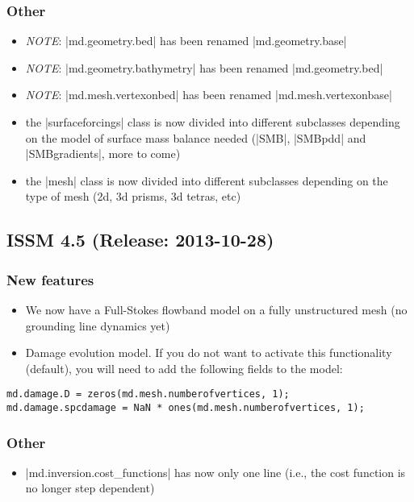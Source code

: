 \subsubsection{Other}
\begin{itemize}
\item \emph{NOTE}: \lstinlinebg|md.geometry.bed| has been renamed \lstinlinebg|md.geometry.base|
\item \emph{NOTE}: \lstinlinebg|md.geometry.bathymetry| has been renamed \lstinlinebg|md.geometry.bed|
\item \emph{NOTE}: \lstinlinebg|md.mesh.vertexonbed| has been renamed \lstinlinebg|md.mesh.vertexonbase|
\item the \lstinlinebg|surfaceforcings| class is now divided into different subclasses depending on the model of surface mass balance needed (\lstinlinebg|SMB|, \lstinlinebg|SMBpdd| and \lstinlinebg|SMBgradients|, more to come)
\item the \lstinlinebg|mesh| class is now divided into different subclasses depending on the type of mesh (2d, 3d prisms, 3d tetras, etc)
\end{itemize}

\subsection*{ISSM 4.5 (Release: 2013-10-28)}
\subsubsection{New features}
\begin{itemize}
\item We now have a Full-Stokes flowband model on a fully unstructured mesh (no grounding line dynamics yet)
\item Damage evolution model. If you do not want to activate this functionality (default), you will need to add the following fields to the model:
\end{itemize}
\begin{lstlisting}
md.damage.D = zeros(md.mesh.numberofvertices, 1);
md.damage.spcdamage = NaN * ones(md.mesh.numberofvertices, 1);
\end{lstlisting}
\subsubsection{Other}
\begin{itemize}
\item \lstinlinebg|md.inversion.cost_functions| has now only one line (i.e., the cost function is no longer step dependent)
\end{itemize}
